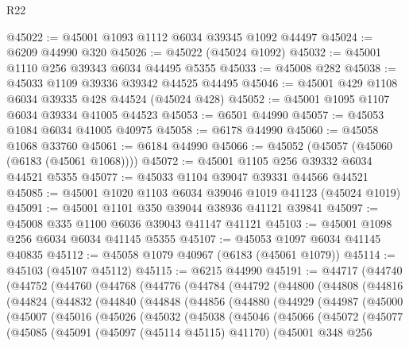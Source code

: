 \begin{lexlean}{R22}
\begin{coremodule}
@45022 := @45001 @1093 @1112 @6034 @39345 @1092 @44497
@45024 := @6209 @44990 @320
@45026 := @45022 (@45024 @1092)
@45032 := @45001 @1110 @256 @39343 @6034 @44495 @5355
@45033 := @45008 @282
@45038 := @45033 @1109 @39336 @39342 @44525 @44495
@45046 := @45001 @429 @1108 @6034 @39335 @428 @44524 (@45024 @428)
@45052 := @45001 @1095 @1107 @6034 @39334 @41005 @44523
@45053 := @6501 @44990
@45057 := @45053 @1084 @6034 @41005 @40975
@45058 := @6178 @44990
@45060 := @45058 @1068 @33760
@45061 := @6184 @44990
@45066 := @45052 (@45057 (@45060 (@6183 (@45061 @1068))))
@45072 := @45001 @1105 @256 @39332 @6034 @44521 @5355
@45077 := @45033 @1104 @39047 @39331 @44566 @44521
@45085 := @45001 @1020 @1103 @6034 @39046 @1019 @41123 (@45024 @1019)
@45091 := @45001 @1101 @350 @39044 @38936 @41121 @39841
@45097 := @45008 @335 @1100 @6036 @39043 @41147 @41121
@45103 := @45001 @1098 @256 @6034 @6034 @41145 @5355
@45107 := @45053 @1097 @6034 @41145 @40835
@45112 := @45058 @1079 @40967 (@6183 (@45061 @1079))
@45114 := @45103 (@45107 @45112)
@45115 := @6215 @44990
@45191 := @44717
    (@44740
      (@44752
        (@44760
          (@44768
            (@44776
              (@44784
                (@44792
                  (@44800
                    (@44808
                      (@44816
                        (@44824
                          (@44832
                            (@44840
                              (@44848
                                (@44856
                                  (@44880
                                    (@44929
                                      (@44987
                                        (@45000
                                          (@45007
                                            (@45016
                                              (@45026
                                                (@45032
                                                  (@45038
                                                    (@45046
                                                      (@45066
                                                        (@45072
                                                          (@45077
                                                            (@45085
                                                              (@45091
                                                                (@45097 (@45114 @45115) @41170)
                                                                (@45001
                                                                  @348
                                                                  @256

\end{coremodule}
\end{lexlean}
